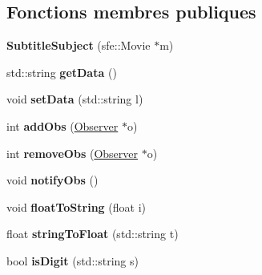 \subsection*{Fonctions membres publiques}
\begin{DoxyCompactItemize}
\item 
\hypertarget{classSubtitleSubject_af4cc18f5f05474102ec8ee78649fa42c}{{\bfseries Subtitle\+Subject} (sfe\+::\+Movie $\ast$m)}\label{classSubtitleSubject_af4cc18f5f05474102ec8ee78649fa42c}

\item 
\hypertarget{classSubtitleSubject_afcb35a1af34b6b926860d544893ae3c4}{std\+::string {\bfseries get\+Data} ()}\label{classSubtitleSubject_afcb35a1af34b6b926860d544893ae3c4}

\item 
\hypertarget{classSubtitleSubject_aa6b5f86666e26cb2ed6e3a282f7d9ded}{void {\bfseries set\+Data} (std\+::string l)}\label{classSubtitleSubject_aa6b5f86666e26cb2ed6e3a282f7d9ded}

\item 
\hypertarget{classSubtitleSubject_afc89e947aab454357dce8ea2f80403ee}{int {\bfseries add\+Obs} (\hyperlink{classObserver}{Observer} $\ast$o)}\label{classSubtitleSubject_afc89e947aab454357dce8ea2f80403ee}

\item 
\hypertarget{classSubtitleSubject_a60e75a2a34275176aaea81738ee4879d}{int {\bfseries remove\+Obs} (\hyperlink{classObserver}{Observer} $\ast$o)}\label{classSubtitleSubject_a60e75a2a34275176aaea81738ee4879d}

\item 
\hypertarget{classSubtitleSubject_a25a62553e49435e7ff42ded01d825b52}{void {\bfseries notify\+Obs} ()}\label{classSubtitleSubject_a25a62553e49435e7ff42ded01d825b52}

\item 
\hypertarget{classSubtitleSubject_acd31f06174b7b2a984c9b20566d412b8}{void {\bfseries float\+To\+String} (float i)}\label{classSubtitleSubject_acd31f06174b7b2a984c9b20566d412b8}

\item 
\hypertarget{classSubtitleSubject_a2d774cd5676e57a53b1f9927de5b9b48}{float {\bfseries string\+To\+Float} (std\+::string t)}\label{classSubtitleSubject_a2d774cd5676e57a53b1f9927de5b9b48}

\item 
\hypertarget{classSubtitleSubject_a4a3626c6f2d2f4d4ca6275db6355d1fa}{bool {\bfseries is\+Digit} (std\+::string s)}\label{classSubtitleSubject_a4a3626c6f2d2f4d4ca6275db6355d1fa}

\end{DoxyCompactItemize}


